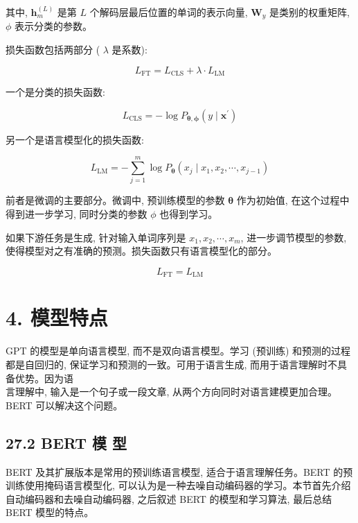 \documentclass[10pt]{article}
\begin{document}
其中, $\boldsymbol{h}_{m}^{(L)}$ 是第 $L$ 个解码层最后位置的单词的表示向量, $\boldsymbol{W}_{y}$ 是类别的权重矩阵, $\phi$ 表示分类的参数。

损失函数包括两部分 ( $\lambda$ 是系数):


\begin{equation*}
L_{\mathrm{FT}}=L_{\mathrm{CLS}}+\lambda \cdot L_{\mathrm{LM}} \tag{27.10}
\end{equation*}


一个是分类的损失函数:


\begin{equation*}
L_{\mathrm{CLS}}=-\log P_{\boldsymbol{\theta}, \boldsymbol{\phi}}\left(y \mid \boldsymbol{x}^{\prime}\right) \tag{27.11}
\end{equation*}


另一个是语言模型化的损失函数:


\begin{equation*}
L_{\mathrm{LM}}=-\sum_{j=1}^{m} \log P_{\boldsymbol{\theta}}\left(x_{j} \mid x_{1}, x_{2}, \cdots, x_{j-1}\right) \tag{27.12}
\end{equation*}


前者是微调的主要部分。微调中, 预训练模型的参数 $\boldsymbol{\theta}$ 作为初始值, 在这个过程中得到进一步学习, 同时分类的参数 $\phi$ 也得到学习。

如果下游任务是生成, 针对输入单词序列是 $x_{1}, x_{2}, \cdots, x_{m}$, 进一步调节模型的参数, 使得模型对之有准确的预测。损失函数只有语言模型化的部分。

$$
L_{\mathrm{FT}}=L_{\mathrm{LM}}
$$

\section*{4. 模型特点}
GPT 的模型是单向语言模型, 而不是双向语言模型。学习 (预训练) 和预测的过程都是自回归的, 保证学习和预测的一致。可用于语言生成, 而用于语言理解时不具备优势。因为语\\
言理解中, 输入是一个句子或一段文章, 从两个方向同时对语言建模更加合理。BERT 可以解决这个问题。

\subsection*{27.2 BERT 模 型}
BERT 及其扩展版本是常用的预训练语言模型, 适合于语言理解任务。BERT 的预训练使用掩码语言模型化, 可以认为是一种去噪自动编码器的学习。本节首先介绍自动编码器和去噪自动编码器, 之后叙述 BERT 的模型和学习算法, 最后总结 BERT 模型的特点。
\end{document}
